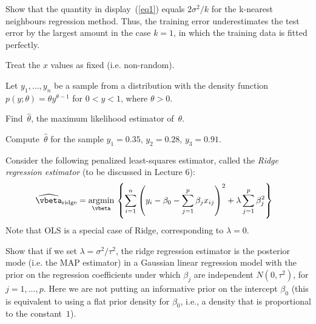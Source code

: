 \documentclass[12pt, answers]{exam}
\def\betahat{\widehat{\vbeta}}
\def\({\left(}
\def\){\right)}
\begin{document}
\begin{questions}
Show that the quantity in display~(\ref{eq1}) equals $2\sigma^2/k$ for the k-nearest neighbours regression method. Thus, the training error underestimates the test error by the largest amount in the case $k=1$, in which the training data is fitted perfectly.

Treat the $x$ values as fixed (i.e. non-random).  \vspace{12pt}



\question

Let $y_1,\ldots,y_n$ be a sample from a distribution with the density function $p(y;\theta)=\theta y^{\theta-1}$ for $0<y<1$, where $\theta>0$.

Find~$\widehat{\theta}$, the maximum likelihood estimator of~$\theta$.

Compute~$\widehat{\theta}$ for the sample $y_1=0.35$, $y_2=0.28$, $y_3=0.91$.  \vspace{12pt}


\question

Consider the following penalized least-squares estimator, called the \textit{Ridge regression estimator} (to be discussed in Lecture 6):
\begin{align*}
\betahat_{\text{ridge}} &= \underset{\vbeta}{\text{argmin}}\, \left\{ \sum_{i=1}^n\(y_i-\beta_0-\sum_{j=1}^{p}\beta_jx_{ij}\)^2 + \lambda \sum_{j=1}^{p}\beta_j^2\right\}
\end{align*}
Note that OLS is a special case of Ridge, corresponding to $\lambda=0$.



Show that if we set $\lambda=\sigma^2/\tau^2$, the ridge regression estimator is the posterior mode (i.e. the MAP estimator) in a Gaussian linear regression model with the prior on the regression coefficients under which $\beta_j$ are independent $N(0,\tau^2)$, for $j=1,...,p$.  Here we are not putting an informative prior on the intercept $\beta_0$ {\footnotesize(this is equivalent to using a flat prior density for $\beta_0$, i.e., a density that is proportional to the constant~$1$)}.

\end{questions}
\end{document}
